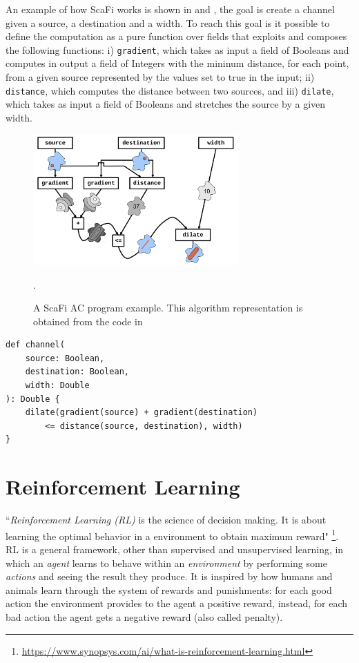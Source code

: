 \documentclass[12pt,a4paper,openright,twoside]{book}
\begin{document}
An example of how ScaFi works is shown in  and , the goal is create a channel given 
    a source, a destination and a width. To reach this goal is it possible to define the computation as a pure function 
    over fields that exploits and composes the following functions:
    i) \texttt{gradient}, which takes as input a field of Booleans and computes in output a field of Integers with the 
        mininum distance, for each point, from a given source represented by the values set to true in the input;
    ii) \texttt{distance}, which computes the distance between two sources, and
    iii) \texttt{dilate}, which takes as input a field of Booleans and stretches the source by a given width.

\begin{figure}[h!]
    \centering
    \includegraphics[width=0.7\textwidth]{figures/channel.png}
    \caption{A ScaFi AC program example. This algorithm representation is obtained from the code in }.
    \label{fig:channel}
\end{figure}

\begin{lstlisting}[caption={A ScaFi AC program example. The algorithm implements a channel between a source and a destination.}, label={lst:channel}]
def channel(
    source: Boolean, 
    destination: Boolean, 
    width: Double
): Double {
    dilate(gradient(source) + gradient(destination) 
        <= distance(source, destination), width)
}
\end{lstlisting}

%
\section{Reinforcement Learning}
%

``\emph{Reinforcement Learning (RL)} is the science of decision making. It is about learning the optimal behavior 
    in a environment to obtain maximum reward" 
    \footnote{\url{https://www.synopsys.com/ai/what-is-reinforcement-learning.html}}.
    RL is a general framework, other than supervised and unsupervised learning, in which an \emph{agent} learns 
    to behave within an \emph{environment} by performing some \emph{actions} and seeing the result they produce.
    It is inspired by how humans and animals learn through the system of rewards and punishments: for each good action
    the environment provides to the agent a positive reward, instead, for each bad action the agent gets a negative 
    reward (also called penalty).
\end{document}

